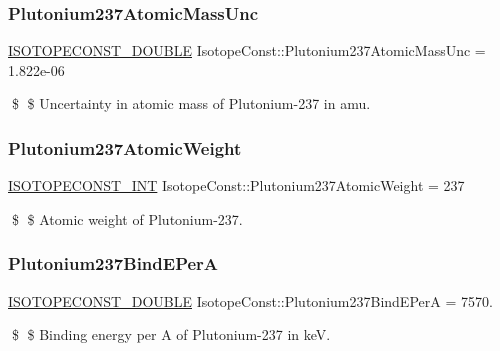\subsubsection{\texorpdfstring{Plutonium237\+Atomic\+Mass\+Unc}{Plutonium237AtomicMassUnc}}
{\footnotesize\ttfamily \mbox{\hyperlink{group___isotope_const-_macros_ga8f45a7272ce02c0b4c65c44636ed719a}{I\+S\+O\+T\+O\+P\+E\+C\+O\+N\+S\+T\+\_\+\+D\+O\+U\+B\+LE}} Isotope\+Const\+::\+Plutonium237\+Atomic\+Mass\+Unc = 1.\+822e-\/06}

\$ \$ Uncertainty in atomic mass of Plutonium-\/237 in amu. \mbox{\label{group___isotope_const-_plutonium-_pu237_ga6b2ebc4e7dd69fe04d68a7d0a8acda20}} 
\subsubsection{\texorpdfstring{Plutonium237\+Atomic\+Weight}{Plutonium237AtomicWeight}}
{\footnotesize\ttfamily \mbox{\hyperlink{group___isotope_const-_macros_ga5f18360b3e99483a35c32d789e62621c}{I\+S\+O\+T\+O\+P\+E\+C\+O\+N\+S\+T\+\_\+\+I\+NT}} Isotope\+Const\+::\+Plutonium237\+Atomic\+Weight = 237}

\$ \$ Atomic weight of Plutonium-\/237. \mbox{\label{group___isotope_const-_plutonium-_pu237_gab03deac0574a0ede04e18508b593be49}} 
\subsubsection{\texorpdfstring{Plutonium237\+Bind\+E\+PerA}{Plutonium237BindEPerA}}
{\footnotesize\ttfamily \mbox{\hyperlink{group___isotope_const-_macros_ga8f45a7272ce02c0b4c65c44636ed719a}{I\+S\+O\+T\+O\+P\+E\+C\+O\+N\+S\+T\+\_\+\+D\+O\+U\+B\+LE}} Isotope\+Const\+::\+Plutonium237\+Bind\+E\+PerA = 7570.}

\$ \$ Binding energy per A of Plutonium-\/237 in keV. \mbox{\label{group___isotope_const-_plutonium-_pu237_gaac000eb4d4274a6afa84af7b4e4a97f7}} 
